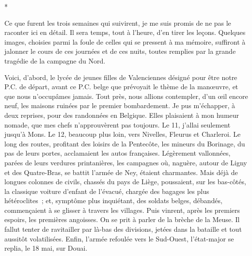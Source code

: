 \documentclass[french,twoside]{book} %
\begin{document}
\begin{center}
\noindent \centerline{*}\par
\end{center}

\noindent Ce que furent les trois semaines qui suivirent, je me suis promis de ne pas le raconter ici en détail. Il sera temps, tout à l’heure, d’en tirer les leçons. Quelques images, choisies parmi la foule de celles qui se pressent à ma mémoire, suffiront à jalonner   le cours de ces journées et de ces nuits, toutes remplies par la grande tragédie de la campagne du Nord.\par
Voici, d’abord, le lycée de jeunes filles de Valenciennes désigné pour être notre P.C. de départ, avant ce P.C. belge que prévoyait le thème de la manœuvre, et que nous n’occupâmes jamais. Tout près, nous allions contempler, d’un œil encore neuf, les maisons ruinées par le premier bombardement. Je pus m’échapper, à deux reprises, pour des randonnées en Belgique. Elles plaisaient à mon humeur nomade, que mes chefs n’approuvèrent pas toujours. Le 11, j’allai seulement jusqu’à Mons. Le 12, beaucoup plus loin, vers Nivelles, Fleurus et Charleroi. Le long des routes, profitant des loisirs de la Pentecôte, les mineurs du Borinage, du pas de leurs portes, acclamaient les autos françaises. Légèrement vallonnées, parées de leurs verdures printanières, les campagnes où, naguère, autour de Ligny et des Quatre-Bras, se battit l’armée de Ney, étaient charmantes. Mais déjà de longues colonnes de civils, chassés du pays de Liège, poussaient, sur les bas-côtés, la classique voiture d’enfant de l’évacué, chargée des bagages les plus hétéroclites ; et, symptôme plus inquiétant, des soldats belges, débandés, commençaient à se glisser à travers les villages. Puis vinrent, après les premiers espoirs, les premières angoisses. On se prit à parler de la brèche de la Meuse. Il fallut tenter de ravitailler par là-bas des divisions, jetées dans la bataille et tout aussitôt volatilisées. Enfin, l’armée refoulée vers le Sud-Ouest, l’état-major se replia, le 18 mai, sur Douai.\par
\end{document}
